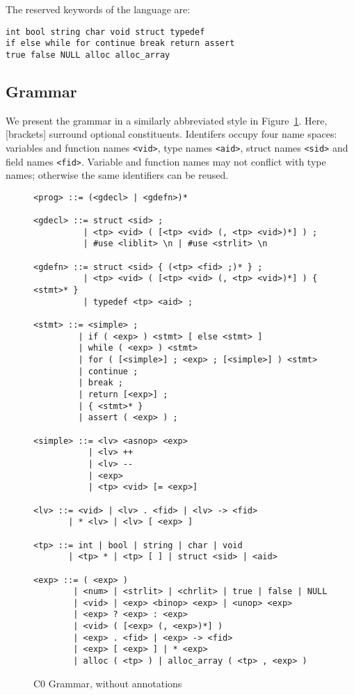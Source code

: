 \documentclass[11pt]{article}
\begin{document}
The reserved keywords of the language are:
\begin{verbatim}
int bool string char void struct typedef
if else while for continue break return assert
true false NULL alloc alloc_array
\end{verbatim}

\subsection{Grammar}

We present the grammar in a similarly abbreviated style in
Figure~\ref{fig:grammar}.  Here, [brackets] surround optional
constituents.  Identifers occupy four name spaces: variables and
function names \verb'<vid>', type names \verb'<aid>', struct names
\verb'<sid>' and field names \verb'<fid>'.  Variable and function
names may not conflict with type names; otherwise the same identifiers
can be reused.

\begin{figure}
\begin{small}
\begin{verbatim}
<prog> ::= (<gdecl> | <gdefn>)*

<gdecl> ::= struct <sid> ;
          | <tp> <vid> ( [<tp> <vid> (, <tp> <vid>)*] ) ;
          | #use <liblit> \n | #use <strlit> \n

<gdefn> ::= struct <sid> { (<tp> <fid> ;)* } ;
          | <tp> <vid> ( [<tp> <vid> (, <tp> <vid>)*] ) { <stmt>* }
          | typedef <tp> <aid> ;

<stmt> ::= <simple> ;
         | if ( <exp> ) <stmt> [ else <stmt> ]
         | while ( <exp> ) <stmt>
         | for ( [<simple>] ; <exp> ; [<simple>] ) <stmt>
         | continue ;
         | break ;
         | return [<exp>] ;
         | { <stmt>* }
         | assert ( <exp> ) ;

<simple> ::= <lv> <asnop> <exp>
           | <lv> ++
           | <lv> --
           | <exp>
           | <tp> <vid> [= <exp>]

<lv> ::= <vid> | <lv> . <fid> | <lv> -> <fid>
       | * <lv> | <lv> [ <exp> ]

<tp> ::= int | bool | string | char | void
       | <tp> * | <tp> [ ] | struct <sid> | <aid>

<exp> ::= ( <exp> )
        | <num> | <strlit> | <chrlit> | true | false | NULL
        | <vid> | <exp> <binop> <exp> | <unop> <exp>
        | <exp> ? <exp> : <exp>
        | <vid> ( [<exp> (, <exp>)*] )
        | <exp> . <fid> | <exp> -> <fid>
        | <exp> [ <exp> ] | * <exp>
        | alloc ( <tp> ) | alloc_array ( <tp> , <exp> )
\end{verbatim}
\end{small}
\caption{C0 Grammar, without annotations}
\label{fig:grammar}
\end{figure}
\end{document}

